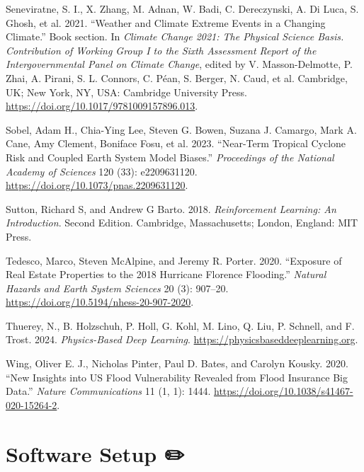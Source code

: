 \documentclass[
  letterpaper,
  DIV=11,
  numbers=noendperiod]{scrreprt}
\newlength{\cslhangindent}
\newenvironment{CSLReferences}[2] %
 {\begin{list}{}{%
  \setlength{\itemindent}{0pt}
  \setlength{\leftmargin}{0pt}
  \setlength{\parsep}{0pt}
  \ifodd #1
   \setlength{\leftmargin}{\cslhangindent}
   \setlength{\itemindent}{-1\cslhangindent}
  \fi
  \setlength{\itemsep}{#2\baselineskip}}}
 {\end{list}}
\begin{document}
\begin{CSLReferences}{1}{0}
Seneviratne, S. I., X. Zhang, M. Adnan, W. Badi, C. Dereczynski, A. Di
Luca, S. Ghosh, et al. 2021. {``Weather and Climate Extreme Events in a
Changing Climate.''} Book section. In \emph{Climate Change 2021: {The}
Physical Science Basis. {Contribution} of Working Group {I} to the Sixth
Assessment Report of the Intergovernmental Panel on Climate Change},
edited by V. Masson-Delmotte, P. Zhai, A. Pirani, S. L. Connors, C.
Péan, S. Berger, N. Caud, et al. Cambridge, UK; New York, NY, USA:
Cambridge University Press.
\url{https://doi.org/10.1017/9781009157896.013}.

Sobel, Adam H., Chia-Ying Lee, Steven G. Bowen, Suzana J. Camargo, Mark
A. Cane, Amy Clement, Boniface Fosu, et al. 2023. {``Near-Term Tropical
Cyclone Risk and Coupled {Earth} System Model Biases.''}
\emph{Proceedings of the National Academy of Sciences} 120 (33):
e2209631120. \url{https://doi.org/10.1073/pnas.2209631120}.

Sutton, Richard S, and Andrew G Barto. 2018. \emph{Reinforcement
Learning: An {Introduction}}. Second Edition. Cambridge, Massachusetts;
London, England: MIT Press.

Tedesco, Marco, Steven McAlpine, and Jeremy R. Porter. 2020. {``Exposure
of Real Estate Properties to the 2018 {Hurricane Florence} Flooding.''}
\emph{Natural Hazards and Earth System Sciences} 20 (3): 907--20.
\url{https://doi.org/10.5194/nhess-20-907-2020}.

Thuerey, N., B. Holzschuh, P. Holl, G. Kohl, M. Lino, Q. Liu, P.
Schnell, and F. Trost. 2024. \emph{Physics-Based Deep Learning}.
\url{https://physicsbaseddeeplearning.org}.

Wing, Oliver E. J., Nicholas Pinter, Paul D. Bates, and Carolyn Kousky.
2020. {``New Insights into {US} Flood Vulnerability Revealed from Flood
Insurance Big Data.''} \emph{Nature Communications} 11 (1, 1): 1444.
\url{https://doi.org/10.1038/s41467-020-15264-2}.

\end{CSLReferences}

\cleardoublepage
{}
{}
\appendix

\chapter{Software Setup ✏️}\label{software-setup}
\end{document}
